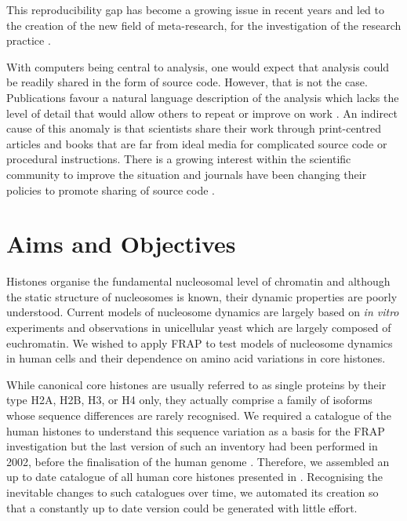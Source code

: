   This reproducibility gap has become a growing issue in recent years and led to
  the creation of the new field of meta-research, for the investigation of the
  research practice \citep{ioannidis2015meta, collins2014researching}.

  With computers being central to analysis, one would
  expect that analysis could be readily shared in the form of source code.
  However, that is not the case.  Publications favour a natural
  language description of the analysis which lacks the level of
  detail that would allow others to repeat or improve on
  work \citep{ince2012case}.
  An indirect cause of this anomaly is that
  scientists share their work through print-centred articles
  and books that are far from ideal media for complicated source
  code or procedural instructions.
  There is a growing
  interest within the scientific community to improve the situation
  and journals have been changing their policies to promote sharing of
  source code \citep{nature-code-share-editorial, gmd-editorial-2013,
    stodden2013toward}.

\section{Aims and Objectives}

  Histones organise the fundamental nucleosomal level of chromatin and
  although the static structure of  nucleosomes is
  known, their dynamic properties are poorly understood.  Current
  models of nucleosome dynamics are largely based on \textit{in vitro}
  experiments and observations in unicellular yeast
  which are largely composed of euchromatin.  We wished to apply FRAP to test
  models of nucleosome dynamics in human cells and their dependence on
  amino acid variations in core histones.

  While canonical core histones are usually referred to as single
  proteins by their type H2A, H2B,
  H3, or H4 only, they actually comprise a family of isoforms whose
  sequence differences are rarely recognised.
  We required a catalogue of the human histones to understand this
  sequence variation as a basis for the FRAP investigation
  but the last version of such an inventory had been performed in
  2002, before the finalisation of the human genome \citep{Marzluff02}.
  Therefore, we assembled an up to
  date catalogue of all human core histones presented in
  .  Recognising the inevitable
  changes to such catalogues over time, we automated its creation so that a
  constantly up to date version could be generated with little effort.

